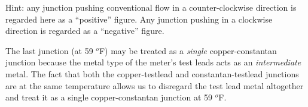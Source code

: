 Hint: any junction pushing conventional flow in a counter-clockwise direction is regarded here as a ``positive'' figure.  Any junction pushing in a clockwise direction is regarded as a ``negative'' figure.

The last junction (at 59 $^{o}$F) may be treated as a {\it single} copper-constantan junction because the metal type of the meter's test leads acts as an {\it intermediate} metal.  The fact that both the copper-testlead and constantan-testlead junctions are at the same temperature allows us to disregard the test lead metal altogether and treat it as a single copper-constantan junction at 59 $^{o}$F.











